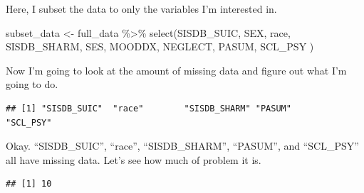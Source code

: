 \documentclass[
]{article}
\newenvironment{Shaded}{\begin{snugshade}}{\end{snugshade}}
\newcommand{\DecValTok}[1]{\textcolor[rgb]{0.00,0.00,0.81}{#1}}
\newcommand{\FunctionTok}[1]{\textcolor[rgb]{0.00,0.00,0.00}{#1}}
\newcommand{\NormalTok}[1]{#1}
\newcommand{\OtherTok}[1]{\textcolor[rgb]{0.56,0.35,0.01}{#1}}
\newcommand{\SpecialCharTok}[1]{\textcolor[rgb]{0.00,0.00,0.00}{#1}}
\begin{document}
Here, I subset the data to only the variables I'm interested in.

\begin{Shaded}
\begin{Highlighting}[]
\NormalTok{subset\_data }\OtherTok{\textless{}{-}}\NormalTok{ full\_data }\SpecialCharTok{\%\textgreater{}\%}
  \FunctionTok{select}\NormalTok{(SISDB\_SUIC, SEX, race, SISDB\_SHARM, SES, MOODDX, NEGLECT, PASUM, SCL\_PSY )}
\end{Highlighting}
\end{Shaded}

Now I'm going to look at the amount of missing data and figure out what
I'm going to do.

\begin{Shaded}
\end{Shaded}

\begin{verbatim}
## [1] "SISDB_SUIC"  "race"        "SISDB_SHARM" "PASUM"       "SCL_PSY"
\end{verbatim}

Okay. ``SISDB\_SUIC'', ``race'', ``SISDB\_SHARM'', ``PASUM'', and
``SCL\_PSY'' all have missing data. Let's see how much of problem it is.

\begin{Shaded}
\end{Shaded}

\begin{verbatim}
## [1] 10
\end{verbatim}

\begin{Shaded}
\end{Shaded}
\end{document}
